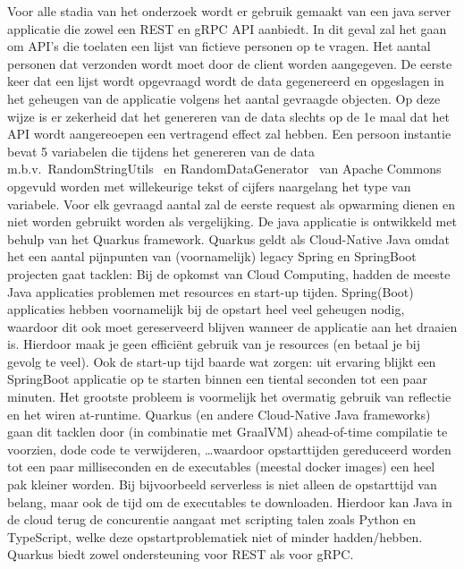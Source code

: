Voor alle stadia van het onderzoek wordt er gebruik gemaakt van een java server applicatie die zowel een REST en gRPC API aanbiedt.
In dit geval zal het gaan om API's die toelaten een lijst van fictieve personen op te vragen. Het aantal personen dat verzonden wordt moet door de client worden aangegeven.
De eerste keer dat een lijst wordt opgevraagd wordt de data gegenereerd en opgeslagen in het geheugen van de applicatie volgens het aantal gevraagde objecten.
Op deze wijze is er zekerheid dat het genereren van de data slechts op de 1e maal dat het API wordt aangereoepen een vertragend effect zal hebben.
Een persoon instantie bevat 5 variabelen die tijdens het genereren van de data m.b.v.\ RandomStringUtils~\parencite{RandomStringUtils}
en RandomDataGenerator~\parencite{RandomDataGenerator} van Apache Commons opgevuld worden met willekeurige tekst of cijfers naargelang het type van variabele.
Voor elk gevraagd aantal zal de eerste request als opwarming dienen en niet worden gebruikt worden als vergelijking.
De java applicatie is ontwikkeld met behulp van het Quarkus framework. Quarkus geldt als Cloud-Native Java omdat het een aantal pijnpunten van (voornamelijk) legacy
Spring en SpringBoot projecten gaat tacklen: Bij de opkomst van Cloud Computing, hadden de meeste Java applicaties problemen met resources en start-up tijden.
Spring(Boot) applicaties hebben voornamelijk bij de opstart heel veel geheugen nodig, waardoor dit ook moet gereserveerd blijven wanneer de applicatie aan het draaien is.
Hierdoor maak je geen effici\"ent gebruik van je resources (en betaal je bij gevolg te veel). Ook de start-up tijd baarde wat zorgen: uit ervaring blijkt een SpringBoot applicatie op te starten
binnen een tiental seconden tot een paar minuten. Het grootste probleem is voormelijk het overmatig gebruik van reflectie en het wiren at-runtime. Quarkus (en andere Cloud-Native Java frameworks)
gaan dit tacklen door (in combinatie met GraalVM) ahead-of-time compilatie te voorzien, dode code te verwijderen, \ldots waardoor opstarttijden gereduceerd worden tot een paar milliseconden en
de executables (meestal docker images) een heel pak kleiner worden. Bij bijvoorbeeld serverless is niet alleen de opstarttijd van belang, maar ook de tijd om de executables te downloaden.
Hierdoor kan Java in de cloud terug de concurentie aangaat met scripting talen zoals Python en TypeScript, welke deze opstartproblematiek niet of minder hadden/hebben.
Quarkus biedt zowel ondersteuning voor REST als voor gRPC.\newline
~\autocite{quarkusAbout}\\

